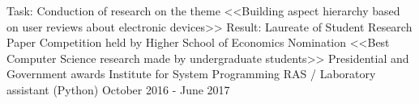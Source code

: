 \begin{cventries}



\cventry
{Task: Conduction of research on the theme <<Building aspect hierarchy based on user reviews about electronic devices>>
		\newline Result: Laureate of Student Research Paper Competition held by Higher School of Economics
		\newline Nomination <<Best Computer Science research made by undergraduate students>>
		\newline Presidential and Government awards
		\newline
	} %
{Institute for System Programming RAS / Laboratory assistant (Python)} %
{} %
{October 2016 - June 2017} %
\noindent	



\end{cventries}
